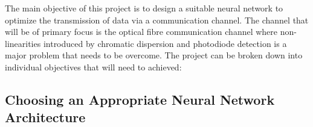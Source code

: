 
\iffalse
Your objectives are the most important part of the proposal. 

Tell the reader what you intend to accomplish; 
	see if you can state the expected outcomes in a clear fashion so that you know, 
	and the reader knows, what you are going to have when finished.
	
What theory will you work out? 
Or what measurements will you make? 
Or what circuit will you build? 
The clearer you are with this, the higher the chances will be for knowing how to get there.
Break the Objectives down into pieces on which each of your teammates will focus. 
Show how the individual objectives create the project’s overall end objective.

Once you know what you will be doing, put the steps into a Gantt Chart.Look online for a Gantt Chart description if you need to.

\fi

The main objective of this project is to design a suitable neural network to optimize the transmission of data via a communication channel. The channel that will be of primary focus is the optical fibre communication channel where non-linearities introduced by chromatic dispersion and photodiode detection is a major problem that needs to be overcome. The project can be broken down into individual objectives that will need to achieved:

\subsection{Choosing an Appropriate Neural Network Architecture}

